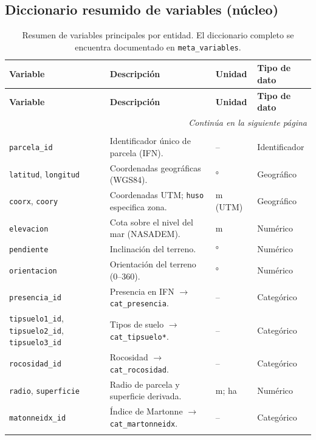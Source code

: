 \subsection*{Diccionario resumido de variables (núcleo)}
\small
\setlength{\LTcapwidth}{\textwidth}
\begin{longtable}{p{3.2cm} p{7.6cm} p{2.4cm} p{2.4cm}}
\caption{Resumen de variables principales por entidad. El diccionario completo se encuentra documentado en \texttt{meta\_variables}.}\\
\toprule
\textbf{Variable} & \textbf{Descripción} & \textbf{Unidad} & \textbf{Tipo de dato} \\
\midrule
\endfirsthead
\toprule
\textbf{Variable} & \textbf{Descripción} & \textbf{Unidad} & \textbf{Tipo de dato} \\
\midrule
\endhead
\midrule
\multicolumn{4}{r}{\emph{Continúa en la siguiente página}} \\
\midrule
\endfoot
\bottomrule
\endlastfoot

\multicolumn{4}{l}{\textbf{parcelas}} \\
\texttt{parcela\_id} & Identificador único de parcela (IFN). & -- & Identificador \\
\texttt{latitud}, \texttt{longitud} & Coordenadas geográficas (WGS84). & ° & Geográfico \\
\texttt{coorx}, \texttt{coory} & Coordenadas UTM; \texttt{huso} especifica zona. & m (UTM) & Geográfico \\
\texttt{elevacion} & Cota sobre el nivel del mar (NASADEM). & m & Numérico \\
\texttt{pendiente} & Inclinación del terreno. & ° & Numérico \\
\texttt{orientacion} & Orientación del terreno (0–360). & ° & Numérico \\
\texttt{presencia\_id} & Presencia en IFN $\rightarrow$ \texttt{cat\_presencia}. & -- & Categórico \\
\texttt{tipsuelo1\_id}, \texttt{tipsuelo2\_id}, \texttt{tipsuelo3\_id} & Tipos de suelo $\rightarrow$ \texttt{cat\_tipsuelo*}. & -- & Categórico \\
\texttt{rocosidad\_id} & Rocosidad $\rightarrow$ \texttt{cat\_rocosidad}. & -- & Categórico \\
\texttt{radio}, \texttt{superficie} & Radio de parcela y superficie derivada. & m; ha & Numérico \\
\texttt{matonneidx\_id} & Índice de Martonne $\rightarrow$ \texttt{cat\_martonneidx}. & -- & Categórico \\
\addlinespace


\end{longtable}
